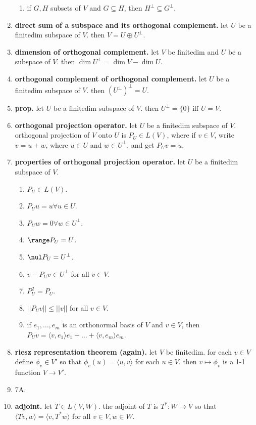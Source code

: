 \begin{enumerate}
\begin{enumerate}
		\item if $G,H$ subsets of $V$ and $G \subseteq H$, then $H^\perp \subseteq G^\perp$. 
	\end{enumerate}
	\item \textbf{direct sum of a subspace and its orthogonal complement. } let $U$ be a finitedim subspace of $V$. then $V = U \oplus U^\perp$. 
	\item \textbf{dimension of orthogonal complement. } let $V$ be finitedim and $U$ be a subspace of $V$. then $\dim U^\perp = \dim V - \dim U$. 
	\item \textbf{orthogonal complement of orthogonal complement. } let $U$ be a finitedim subspace of $V$. then $(U^\perp)^\perp = U$. 
	\item \textbf{prop. } let $U$ be a finitedim subspace of $V$. then $U^\perp = \{0\}$ iff $U=V$. 
	\item \textbf{orthogonal projection operator. } let $U$ be a finitedim subspace of $V$. orthogonal projection of $V$ onto $U$ is $P_U \in L(V)$, where if $v \in V$, write $v = u+w$, where $u \in U$ and $w \in U^\perp$, and get $P_U v = u$. 
	\item \textbf{properties of orthogonal projection operator. } let $U$ be a finitedim subspace of $V$. 
	\begin{enumerate}
		\item $P_U \in L(V)$. 
		\item $P_U u = u \forall u \in U$. 
		\item $P_U w = 0 \forall w \in U^\perp$. 
		\item $\range P_U = U$. 
		\item $\nul P_U = U^\perp$. 
		\item $v - P_U v \in U^\perp$ for all $v \in V$. 
		\item $P_U^2 = P_U$. 
		\item $||P_U v || \leq ||v||$ for all $v \in V$. 
		\item if $e_1,\dots,e_m$ is an orthonormal basis of $V$ and $v \in V$, then $P_U v = \langle v,e_1 \rangle e_1 + \dots + \langle v,e_m \rangle e_m$. 
	\end{enumerate}
	\item \textbf{riesz representation theorem (again). } let $V$ be finitedim. for each $v \in V$ define $\phi_v \in V'$ so that $\phi_v (u) = \langle u,v \rangle$ for each $u \in V$. then $v \mapsto \phi_v$ is a 1-1 function $V \to V'$. 
	\item 7A. 
	\item \textbf{adjoint. } let $T \in L(V,W)$. the adjoint of $T$ is $T^*: W \to V$ so that $\langle Tv,w \rangle = \langle v,T^*w \rangle$ for all $v \in V, w \in W$. 

\end{enumerate}
